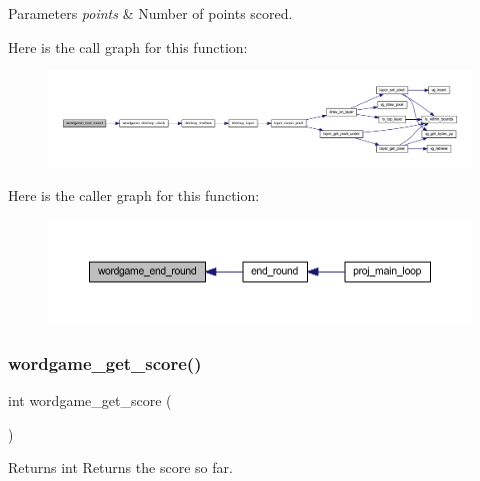 \begin{DoxyParams}{Parameters}
{\em points} & Number of points scored. \\
\hline
\end{DoxyParams}
Here is the call graph for this function\+:\nopagebreak
\begin{figure}[H]
\begin{center}
\leavevmode
\includegraphics[width=350pt]{group__wordpicker_ga0b9b141f8ba315b5f78506c4d0bdc666_cgraph}
\end{center}
\end{figure}
Here is the caller graph for this function\+:\nopagebreak
\begin{figure}[H]
\begin{center}
\leavevmode
\includegraphics[width=350pt]{group__wordpicker_ga0b9b141f8ba315b5f78506c4d0bdc666_icgraph}
\end{center}
\end{figure}
\mbox{\label{group__wordpicker_ga620548888658cd02972c55f77dfda24b}} 
\subsubsection{\texorpdfstring{wordgame\+\_\+get\+\_\+score()}{wordgame\_get\_score()}}
{\footnotesize\ttfamily int wordgame\+\_\+get\+\_\+score (\begin{DoxyParamCaption}{ }\end{DoxyParamCaption})}

\begin{DoxyReturn}{Returns}
int Returns the score so far. 
\end{DoxyReturn}
\mbox{\label{group__wordpicker_ga331045a68738d98e1553c33ea143720b}} 
